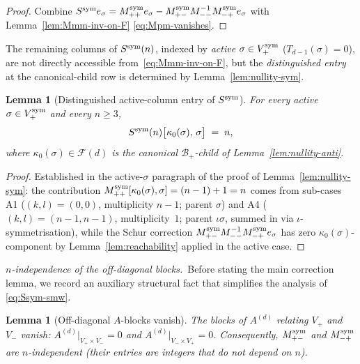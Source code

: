 \documentclass{amsart}
\newtheorem{lemma}[theorem]{Lemma}
\theoremstyle{definition}
\theoremstyle{remark}
\begin{document}
\begin{proof}
Combine $S^{\rm sym} e_\sigma = M_{++}^{\rm sym} e_\sigma -
M_{+-}^{\rm sym} M_{--}^{-1} M_{-+}^{\rm sym} e_\sigma$ with
Lemma~\ref{lem:Mmm-inv-on-F} \eqref{eq:Mpm-vanishes}.
\end{proof}

The remaining columns of $S^{\rm sym}(n)$, indexed by
\emph{active} $\sigma \in V_+^{\rm sym}$ ($T_{d-1}(\sigma) = 0$),
are not directly accessible from~\eqref{eq:Mmm-inv-on-F}, but the
\emph{distinguished entry} at the canonical-child row is determined
by Lemma~\ref{lem:nullity-sym}.

\begin{lemma}[Distinguished active-column entry of $S^{\rm sym}$]
\label{lem:Spsym-active}
For every active $\sigma \in V_+^{\rm sym}$ and every $n \ge 3$,
\begin{equation}\label{eq:Spsym-active}
  S^{\rm sym}(n)\bigl[\kappa_0(\sigma),\, \sigma\bigr] \;=\; n,
\end{equation}
where $\kappa_0(\sigma) \in \mathcal{F}(d)$ is the canonical
$\mathcal{B}_+$-child of Lemma~\ref{lem:nullity-anti}.
\end{lemma}

\begin{proof}
Established in the active-$\sigma$ paragraph of the proof of
Lemma~\ref{lem:nullity-sym}: the contribution
$M_{++}^{\rm sym}[\kappa_0(\sigma), \sigma] = (n-1) + 1 = n$ comes
from sub-cases A1 \textup{(}$(k, l) = (0, 0)$, multiplicity $n-1$;
parent $\sigma$\textup{)} and A4 \textup{(}$(k, l) = (n-1, n-1)$,
multiplicity~$1$; parent $\iota\sigma$, summed in via
$\iota$-symmetrisation\textup{)}, while the Schur correction
$M_{+-}^{\rm sym} M_{--}^{-1} M_{-+}^{\rm sym} e_\sigma$ has zero
$\kappa_0(\sigma)$-component by Lemma~\ref{lem:reachability} applied
in the active case.
\end{proof}

\medskip
\noindent\textit{$n$-independence of the off-diagonal blocks.}\
Before stating the main correction lemma, we record an
auxiliary structural fact that simplifies the analysis of
\eqref{eq:Ssym-smw}.

\begin{lemma}[Off-diagonal $A$-blocks vanish]
\label{lem:Apm-Amp-zero}
The blocks of $A^{(d)}$ relating $V_+$ and $V_-$ vanish:
$A^{(d)}\bigl|_{V_+ \times V_-} = 0$ and
$A^{(d)}\bigl|_{V_- \times V_+} = 0$.  Consequently,
$M_{+-}^{\rm sym}$ and $M_{-+}^{\rm sym}$ are
$n$-independent (their entries are integers that do not
depend on $n$).
\end{lemma}
\end{document}
